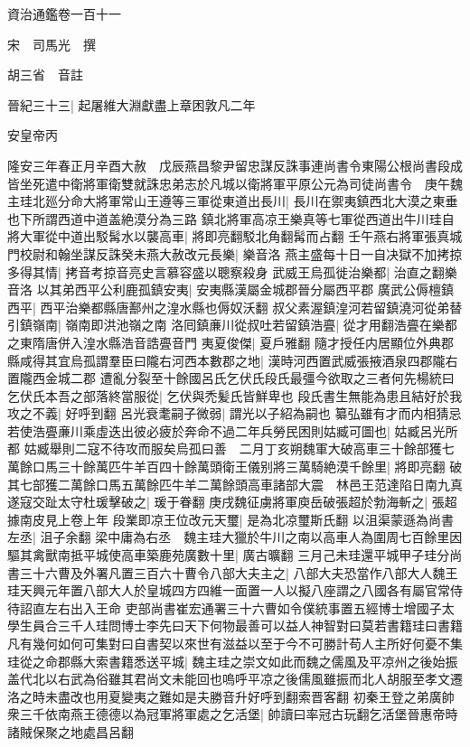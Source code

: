 資治通鑑卷一百十一


宋　司馬光　撰

胡三省　音註

晉紀三十三|{
	起屠維大淵獻盡上章困敦凡二年}


安皇帝丙

隆安三年春正月辛酉大赦　戊辰燕昌黎尹留忠謀反誅事連尚書令東陽公根尚書段成皆坐死遣中衛將軍衛雙就誅忠弟志於凡城以衛將軍平原公元為司徒尚書令　庚午魏主珪北廵分命大將軍常山王遵等三軍從東道出長川|{
	長川在禦夷鎮西北大漠之東垂也下所謂西道中道盖絶漠分為三路}
鎮北將軍高凉王樂真等七軍從西道出牛川珪自將大軍從中道出駁髯水以襲高車|{
	將即亮翻駁北角翻髯而占翻}
壬午燕右將軍張真城門校尉和翰坐謀反誅癸未燕大赦改元長樂|{
	樂音洛}
燕主盛每十日一自决獄不加拷掠多得其情|{
	拷音考掠音亮史言慕容盛以聰察殺身}
武威王烏孤徙治樂都|{
	治直之翻樂音洛}
以其弟西平公利鹿孤鎮安夷|{
	安夷縣漢屬金城郡晉分屬西平郡}
廣武公傉檀鎮西平|{
	西平治樂都縣唐鄯州之湟水縣也傉奴沃翻}
叔父素渥鎮湟河若留鎮澆河從弟替引鎮嶺南|{
	嶺南即洪池嶺之南}
洛囘鎮亷川從叔吐若留鎮浩亹|{
	從才用翻浩亹在樂都之東隋唐併入湟水縣浩音誥亹音門}
夷夏俊傑|{
	夏戶雅翻}
隨才授任内居顯位外典郡縣咸得其宜烏孤謂羣臣曰隴右河西本數郡之地|{
	漢時河西置武威張掖酒泉四郡隴右置隴西金城二郡}
遭亂分裂至十餘國呂氏乞伏氏段氏最彊今欲取之三者何先楊統曰乞伏氏本吾之部落終當服從|{
	乞伏與禿髪氏皆鮮卑也}
段氏書生無能為患且結好於我攻之不義|{
	好呼到翻}
呂光衰耄嗣子微弱|{
	謂光以子紹為嗣也}
纂弘雖有才而内相猜忌若使浩亹亷川乘虛迭出彼必疲於奔命不過二年兵勞民困則姑臧可圖也|{
	姑臧呂光所都}
姑臧舉則二寇不待攻而服矣烏孤曰善　二月丁亥朔魏軍大破高車三十餘部獲七萬餘口馬三十餘萬匹牛羊百四十餘萬頭衛王儀别將三萬騎絶漠千餘里|{
	將即亮翻}
破其七部獲二萬餘口馬五萬餘匹牛羊二萬餘頭高車諸部大震　林邑王范達陷日南九真遂寇交趾太守杜瑗擊破之|{
	瑗于眷翻}
庚戌魏征虜將軍庾岳破張超於勃海斬之|{
	張超據南皮見上卷上年}
段業即凉王位改元天璽|{
	是為北凉璽斯氏翻}
以沮渠蒙遜為尚書左丞|{
	沮子余翻}
梁中庸為右丞　魏主珪大獵於牛川之南以高車人為圍周七百餘里因驅其禽獸南抵平城使高車築鹿苑廣數十里|{
	廣古曠翻}
三月己未珪還平城甲子珪分尚書三十六曹及外署凡置三百六十曹令八部大夫主之|{
	八部大夫恐當作八部大人魏王珪天興元年置八部大人於皇城四方四維一面置一人以擬八座謂之八國各有屬官常侍待詔直左右出入王命}
吏部尚書崔宏通署三十六曹如令僕統事置五經博士增國子太學生員合三千人珪問博士李先曰天下何物最善可以益人神智對曰莫若書籍珪曰書籍凡有幾何如何可集對曰自書契以來世有滋益以至于今不可勝計苟人主所好何憂不集珪從之命郡縣大索書籍悉送平城|{
	魏主珪之崇文如此而魏之儒風及平凉州之後始振盖代北以右武為俗雖其君尚文未能回也嗚呼平凉之後儒風雖振而北人胡服至孝文遷洛之時未盡改也用夏變夷之難如是夫勝音升好呼到翻索晋客翻}
初秦王登之弟廣帥衆三千依南燕王德德以為冠軍將軍處之乞活堡|{
	帥讀曰率冠古玩翻乞活堡晉惠帝時諸賊保聚之地處昌呂翻}
